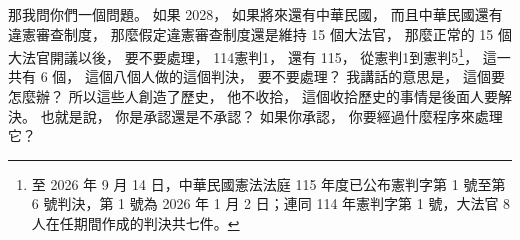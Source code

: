 \hypertarget{w01:cue:1178}{}那我問你們一個問題。
\hypertarget{w01:cue:1179}{}如果 2028，
\hypertarget{w01:cue:1180}{}如果將來還有中華民國，
\hypertarget{w01:cue:1181}{}而且中華民國還有違憲審查制度，
\hypertarget{w01:cue:1182}{}那麼假定違憲審查制度還是維持 15 個大法官，
\hypertarget{w01:cue:1183}{}那麼正常的 15 個大法官開議以後，
\hypertarget{w01:cue:1184}{}要不要處理，
\hypertarget{w01:cue:1185}{}114憲判1，
\hypertarget{w01:cue:1186}{}還有 115，
\hypertarget{w01:cue:1187}{}從憲判1到憲判5\footnote{至 2026 年 9 月 14 日，中華民國憲法法庭 115 年度已公布憲判字第 1 號至第 6 號判決，第 1 號為 2026 年 1 月 2 日；連同 114 年憲判字第 1 號，大法官 8 人在任期間作成的判決共七件。}，
\hypertarget{w01:cue:1188}{}這一共有 6 個，
\hypertarget{w01:cue:1189}{}這個八個人做的這個判決，
\hypertarget{w01:cue:1190}{}要不要處理？
\hypertarget{w01:cue:1191}{}我講話的意思是，
\hypertarget{w01:cue:1192}{}這個要怎麼辦？
\hypertarget{w01:cue:1193}{}所以這些人創造了歷史，
\hypertarget{w01:cue:1194}{}他不收拾，
\hypertarget{w01:cue:1195}{}這個收拾歷史的事情是後面人要解決。
\hypertarget{w01:cue:1196}{}也就是說，
\hypertarget{w01:cue:1197}{}你是承認還是不承認？
\hypertarget{w01:cue:1198}{}如果你承認，
\hypertarget{w01:cue:1199}{}你要經過什麼程序來處理它？

